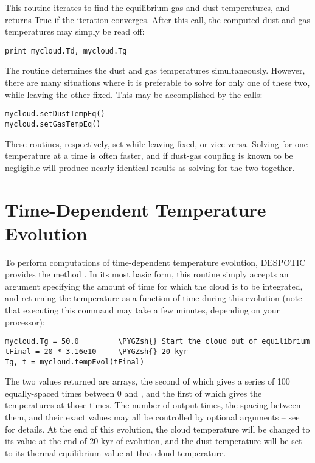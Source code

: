 \documentclass[letterpaper,10pt,english]{sphinxmanual}
\def\PYGZsh{\char`\#}
\begin{document}
This routine iterates to find the equilibrium gas and dust
temperatures, and returns True if the iteration converges. After this
call, the computed dust and gas temperatures may simply be read off:

\begin{Verbatim}[commandchars=\\\{\}]
print mycloud.Td, mycloud.Tg
\end{Verbatim}

The  routine determines the dust and gas
temperatures simultaneously. However, there are many situations where
it is preferable to solve for only one of these two, while leaving the
other fixed. This may be accomplished by the calls:

\begin{Verbatim}[commandchars=\\\{\}]
mycloud.setDustTempEq()
mycloud.setGasTempEq()
\end{Verbatim}

These routines, respectively, set  while leaving
 fixed, or vice-versa. Solving for one temperature at a
time is often faster, and if dust-gas coupling is known to be
negligible will produce nearly identical results as solving for the
two together.


\section{Time-Dependent Temperature Evolution}
\label{functions:ssec-temp-evol}\label{functions:time-dependent-temperature-evolution}
To perform computations of time-dependent temperature evolution,
DESPOTIC provides the method . In its most basic
form, this routine simply accepts an argument specifying the amount of
time for which the cloud is to be integrated, and returning the
temperature as a function of time during this evolution (note that
executing this command may take a few minutes, depending on your
processor):

\begin{Verbatim}[commandchars=\\\{\}]
mycloud.Tg = 50.0         \PYGZsh{} Start the cloud out of equilibrium
tFinal = 20 * 3.16e10     \PYGZsh{} 20 kyr
Tg, t = mycloud.tempEvol(tFinal)
\end{Verbatim}

The two values returned are arrays, the second of which gives a series
of 100 equally-spaced times between 0 and , and the first of
which gives the temperatures at those times. The number of output
times, the spacing between them, and their exact values may all be
controlled by optional arguments -- see {\hyperref[fulldoc:sssec-full-cloud]{\emph{}}} for
details. At
the end of this evolution, the cloud temperature 
will be changed to its value at the end of 20 kyr of evolution, and
the dust temperature  will be set to its thermal
equilibrium value at that cloud temperature.
\end{document}
